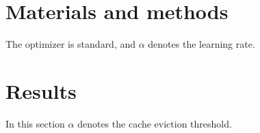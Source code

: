 \section{Materials and methods}
The optimizer is standard, and $\alpha$ denotes the learning rate.
\section{Results}
In this section $\alpha$ denotes the cache eviction threshold.
